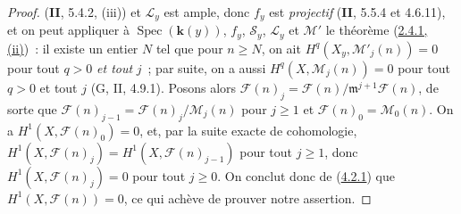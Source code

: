\begin{proof}
(\textbf{II}, 5.4.2, (iii)) et $\mathcal L_y$ est ample, donc $f_y$ est \emph{projectif}
(\textbf{II}, 5.5.4 et 4.6.11), et on peut appliquer à
$\operatorname{Spec}(\boldsymbol{k}(y))$, $f_y$, $\mathcal S_y$, $\mathcal L_y$ et
$\mathcal M'$ le théorème (\hyperref[III.2.4.1-fr]{2.4.1, (ii)})~: il
existe un entier $N$ tel que pour $n\geq N$, on ait
$H^q(X_y,\mathcal M'_j(n))=0$ pour tout $q>0$ \emph{et tout} $j$~; par suite, on a
aussi $H^q(X,\mathcal M_j(n))=0$ pour tout $q>0$ et tout $j$
(G, II, 4.9.1). Posons alors
$\mathcal F(n)_j=\mathcal F(n)/\mathfrak m^{j+1}\mathcal F(n)$,
de sorte que $\mathcal F(n)_{j-1}=\mathcal F(n)_j/\mathcal M_j(n)$ pour
$j\geq1$ et $\mathcal F(n)_0=\mathcal M_0(n)$. On a
$H^1(X,\mathcal F(n)_0)=0$, et, par la suite exacte de cohomologie,
$H^1(X,\mathcal F(n)_j)=H^1(X,\mathcal F(n)_{j-1})$ pour tout $j\geq1$,
donc $H^1(X,\mathcal F(n)_j)=0$ pour tout $j\geq0$. On conclut donc de
(\hyperref[III.4.2.1-fr]{4.2.1}) que $H^1(X,\mathcal F(n))=0$, ce qui
achève de prouver notre assertion.


\end{proof}
